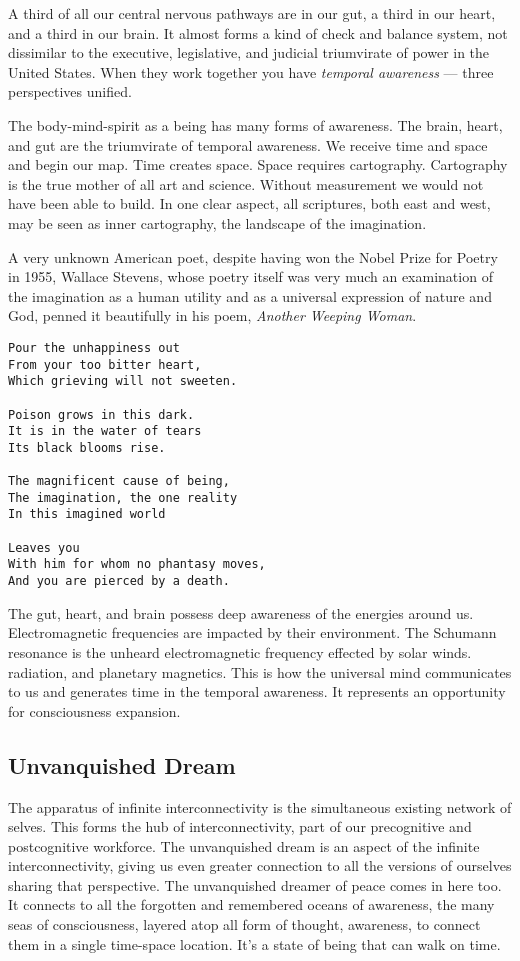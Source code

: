 A third of all our central nervous pathways are in our gut, a third in
our heart, and a third in our brain. It almost forms a kind of check and
balance system, not dissimilar to the executive, legislative, and
judicial triumvirate of power in the United States. When they work
together you have \emph{temporal awareness} --- three perspectives
unified.

The body-mind-spirit as a being has many forms of awareness. The brain,
heart, and gut are the triumvirate of temporal awareness. We receive
time and space and begin our map. Time creates space. Space requires
cartography. Cartography is the true mother of all art and science.
Without measurement we would not have been able to build. In one clear
aspect, all scriptures, both east and west, may be seen as inner
cartography, the landscape of the imagination.

A very unknown American poet, despite having won the Nobel Prize for
Poetry in 1955, Wallace Stevens, whose poetry itself was very much an
examination of the imagination as a human utility and as a universal
expression of nature and God, penned it beautifully in his poem,
\emph{Another Weeping Woman}.

\begin{verbatim}
Pour the unhappiness out
From your too bitter heart,
Which grieving will not sweeten.

Poison grows in this dark.
It is in the water of tears
Its black blooms rise.

The magnificent cause of being,
The imagination, the one reality
In this imagined world

Leaves you
With him for whom no phantasy moves,
And you are pierced by a death.
\end{verbatim}

The gut, heart, and brain possess deep awareness of the energies around
us. Electromagnetic frequencies are impacted by their environment. The
Schumann resonance is the unheard electromagnetic frequency effected by
solar winds. radiation, and planetary magnetics. This is how the
universal mind communicates to us and generates time in the temporal
awareness. It represents an opportunity for consciousness expansion.

\subsection{Unvanquished Dream}\label{unvanquished-dream}

The apparatus of infinite interconnectivity is the simultaneous existing
network of selves. This forms the hub of interconnectivity, part of our
precognitive and postcognitive workforce. The unvanquished dream is an
aspect of the infinite interconnectivity, giving us even greater
connection to all the versions of ourselves sharing that perspective.
The unvanquished dreamer of peace comes in here too. It connects to all
the forgotten and remembered oceans of awareness, the many seas of
consciousness, layered atop all form of thought, awareness, to connect
them in a single time-space location. It's a state of being that can
walk on time.

